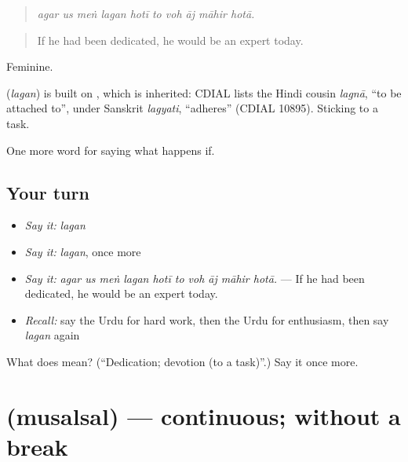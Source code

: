 \begin{quote}
         
\end{quote}

\begin{quote}
\emph{agar us meṅ lagan hotī to voh āj māhir hotā.}
\end{quote}

\begin{quote}
If he had been dedicated, he would be an expert today.
\end{quote}

Feminine.

\begin{cousinweb}
\textbf{} (\emph{lagan}) is built on \textbf{}, which is inherited: CDIAL lists the Hindi cousin \emph{lagnā}, \textquotedblleft{}to be attached to\textquotedblright{}, under Sanskrit \emph{lagyati}, \textquotedblleft{}adheres\textquotedblright{} (CDIAL 10895). Sticking to a task.
\end{cousinweb}

\begin{grammarlens}[title={What you've built}]
One more word for saying what happens if.
\end{grammarlens}

\subsection*{Your turn}
\begin{itemize}
\raggedright
  \item \emph{Say it:} \emph{lagan}
  \item \emph{Say it:} \emph{lagan}, once more
  \item \emph{Say it:} \emph{agar us meṅ lagan hotī to voh āj māhir hotā.} — If he had been dedicated, he would be an expert today.
  \item \emph{Recall:} say the Urdu for hard work, then the Urdu for enthusiasm, then say \emph{lagan} again
\end{itemize}

\begin{tcolorbox}[breakable,colback=teal!4,colframe=teal!35!black,title={Before you move on}]
What does  mean? (\textquotedblleft{}Dedication; devotion (to a task)\textquotedblright{}.) Say it once more.
\end{tcolorbox}
\section[\texorpdfstring{\ur{مسلسل} (musalsal)}{مسلسل (musalsal)}]{ (musalsal) — continuous; without a break}

